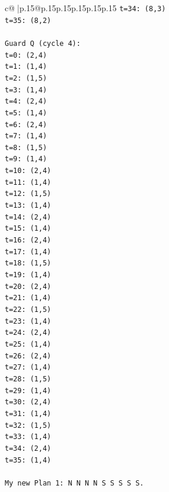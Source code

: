 \documentclass{article}
\begin{document}
{\begin{supertabular}{c@{$\;$}|p{.15\linewidth}@{}p{.15\linewidth}p{.15\linewidth}p{.15\linewidth}p{.15\linewidth}p{.15\linewidth}}
{{{\texttt{t=34: (8,3)} \\
\texttt{t=35: (8,2)} \\
\\ 
\texttt{Guard Q (cycle 4):} \\
\texttt{t=0: (2,4)} \\
\texttt{t=1: (1,4)} \\
\texttt{t=2: (1,5)} \\
\texttt{t=3: (1,4)} \\
\texttt{t=4: (2,4)} \\
\texttt{t=5: (1,4)} \\
\texttt{t=6: (2,4)} \\
\texttt{t=7: (1,4)} \\
\texttt{t=8: (1,5)} \\
\texttt{t=9: (1,4)} \\
\texttt{t=10: (2,4)} \\
\texttt{t=11: (1,4)} \\
\texttt{t=12: (1,5)} \\
\texttt{t=13: (1,4)} \\
\texttt{t=14: (2,4)} \\
\texttt{t=15: (1,4)} \\
\texttt{t=16: (2,4)} \\
\texttt{t=17: (1,4)} \\
\texttt{t=18: (1,5)} \\
\texttt{t=19: (1,4)} \\
\texttt{t=20: (2,4)} \\
\texttt{t=21: (1,4)} \\
\texttt{t=22: (1,5)} \\
\texttt{t=23: (1,4)} \\
\texttt{t=24: (2,4)} \\
\texttt{t=25: (1,4)} \\
\texttt{t=26: (2,4)} \\
\texttt{t=27: (1,4)} \\
\texttt{t=28: (1,5)} \\
\texttt{t=29: (1,4)} \\
\texttt{t=30: (2,4)} \\
\texttt{t=31: (1,4)} \\
\texttt{t=32: (1,5)} \\
\texttt{t=33: (1,4)} \\
\texttt{t=34: (2,4)} \\
\texttt{t=35: (1,4)} \\
\\ 
\texttt{My new Plan 1: N N N N S S S S S.} \\
}}}
\end{supertabular}}
\end{document}
